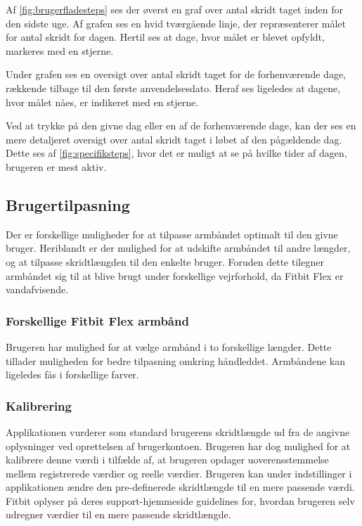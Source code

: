\noindent
Af \autoref{fig:brugerfladesteps} ses der øverst en graf over antal skridt taget inden for den sidste uge. Af grafen ses en hvid tværgående linje, der repræsenterer målet for antal skridt for dagen. Hertil ses at dage, hvor målet er blevet opfyldt, markeres med en stjerne.

Under grafen ses en oversigt over antal skridt taget for de forhenværende dage, rækkende tilbage til den første anvendelsesdato. Heraf ses ligeledes at dagene, hvor målet nåes, er indikeret med en stjerne. 

Ved at trykke på den givne dag eller en af de forhenværende dage, kan der ses en mere detaljeret oversigt over antal skridt taget i løbet af den pågældende dag. Dette ses af \autoref{fig:specifiksteps}, hvor det er muligt at se på hvilke tider af dagen, brugeren er mest aktiv.  


\subsection{Brugertilpasning} \label{sec:brugertilpasning}
Der er forskellige muligheder for at tilpasse armbåndet optimalt til den givne bruger. Heriblandt er der mulighed for at udskifte armbåndet til andre længder, og at tilpasse skridtlængden til den enkelte bruger. Foruden dette tilegner armbåndet sig til at blive brugt under forskellige vejrforhold, da Fitbit Flex er vandafvisende. 

\subsubsection{Forskellige Fitbit Flex armbånd}
Brugeren har mulighed for at vælge armbånd i to forskellige længder. Dette tillader muligheden for bedre tilpasning omkring håndleddet. Armbåndene kan ligeledes fås i forskellige farver.

\subsubsection{Kalibrering}
Applikationen vurderer som standard brugerens skridtlængde ud fra de angivne oplysninger ved oprettelsen af brugerkontoen. Brugeren har dog mulighed for at kalibrere denne værdi i tilfælde af, at brugeren opdager uoverensstemmelse mellem registrerede værdier og reelle værdier. Brugeren kan under indstillinger i applikationen ændre den pre-definerede skridtlængde til en mere passende værdi. Fitbit oplyser på deres support-hjemmeside guidelines for, hvordan brugeren selv udregner værdier til en mere passende skridtlængde.   

